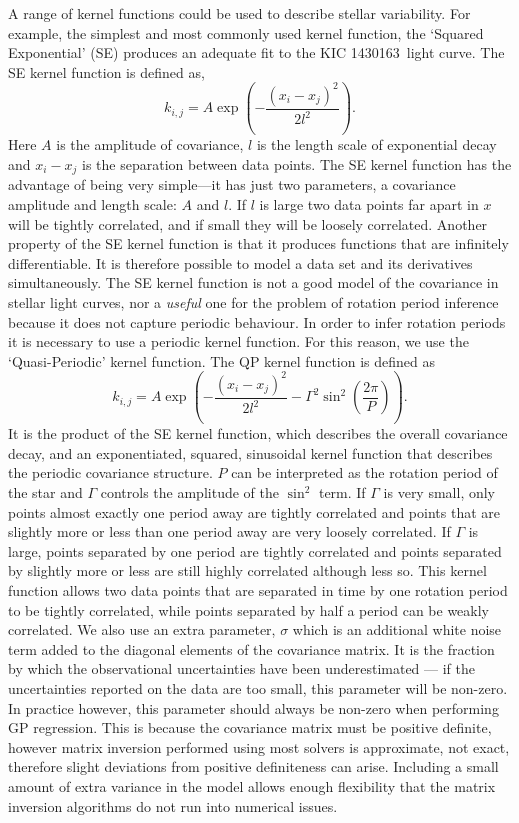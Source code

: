 \documentclass[useAMS, usenatbib, preprint, 12pt]{aastex}
\newcommand{\kepexample}{1430163}
\newcommand{\eg}{{\it e.g.}}
\begin{document}
A range of kernel functions could be used to describe stellar variability.
For example, the simplest and most commonly used kernel function, the `Squared
Exponential' (SE) produces an adequate fit to the KIC \kepexample\ light
curve.
The SE kernel function is defined as,
\begin{equation}
k_{i,j} = A \exp \left(-\frac{(x_i - x_j)^2}{2l^2} \right).
\end{equation}
\label{eq:SE}
Here $A$ is the amplitude of covariance, $l$ is the length scale of
exponential decay and $x_i-x_j$ is the separation between data points.
The SE kernel function has the advantage of being very simple---it has just
two parameters, a covariance amplitude and length scale: $A$ and $l$.
If $l$ is large two data points far apart in $x$ will be tightly correlated,
and if small they will be loosely correlated.
Another property of the SE kernel function is that it produces functions that
are infinitely differentiable.
It is therefore possible to model a data set and its derivatives
simultaneously.
The SE kernel function is not a good model of the covariance in stellar light
curves, nor a {\it useful} one for the problem of rotation period inference
because it does not capture periodic behaviour.
In order to infer rotation periods it is necessary to use a periodic kernel
function.
For this reason, we use the `Quasi-Periodic' kernel function.
The QP kernel function is defined as
\begin{equation}
k_{i,j} = A \exp \left(-\frac{(x_i - x_j)^2}{2l^2} -
\Gamma^2 \sin^2(\frac{2\pi}{P}) \right).
\end{equation}
\label{eq:QP}
It is the product of the SE kernel function, which describes the overall
covariance decay, and an exponentiated, squared, sinusoidal kernel function
that describes the periodic covariance structure.
$P$ can be interpreted as the rotation period of the star and $\Gamma$
controls the amplitude of the $\sin^2$ term.
If $\Gamma$ is very small, only points almost exactly one period away are
tightly correlated and points that are slightly more or less than one period
away are very loosely correlated.
If $\Gamma$ is large, points separated by one period are tightly
correlated and points separated by slightly more or less are still highly
correlated although less so.
This kernel function allows two data points that are separated in time by one
rotation period to be tightly correlated, while points separated by half a
period can be weakly correlated.
We also use an extra parameter, $\sigma$ which is an additional white noise
term added to the diagonal elements of the covariance matrix.
It is the fraction by which the observational uncertainties have been
underestimated --- if the uncertainties reported on the data are too small,
this parameter will be non-zero.
In practice however, this parameter should always be non-zero when performing
GP regression.
This is because the covariance matrix must be positive definite, however
matrix inversion performed using most solvers is approximate, not exact,
therefore slight deviations from positive definiteness can arise.
Including a small amount of extra variance in the model allows enough
flexibility that the matrix inversion algorithms do not run into numerical
issues.
\end{document}
